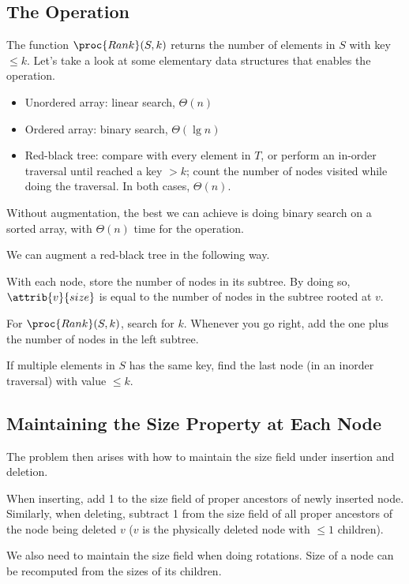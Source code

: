 \subsection{The  Operation}

The function $\proc{Rank}(S,k)$ returns the number of elements in $S$ with key $\leq k$. Let's take a look at some elementary data structures that enables the  operation.

\begin{itemize}
    \item Unordered array: linear search, $\Theta(n)$
    \item Ordered array: binary search, $\Theta(\lg n)$
    \item Red-black tree: compare with every element in $T$, or perform an in-order traversal until reached a key $> k$; count the number of nodes visited while doing the traversal. In both cases, $\Theta(n)$.
\end{itemize}

Without augmentation, the best we can achieve is doing binary search on a sorted array, with $\Theta(n)$ time for the  operation.

We can augment a red-black tree in the following way.

With each node, store the number of nodes in its subtree. By doing so, $\attrib{v}{size}$ is equal to the number of nodes in the subtree rooted at $v$.

For $\proc{Rank}(S,k)$, search for $k$. Whenever you go right, add the one plus the number of nodes in the left subtree. 

If multiple elements in $S$ has the same key, find the last node (in an inorder traversal) with value $\leq k$.

\subsection{Maintaining the Size Property at Each Node}

The problem then arises with how to maintain the size field under insertion and deletion.

When inserting, add 1 to the size field of proper ancestors of newly inserted node. Similarly, when deleting, subtract 1 from the size field of all proper ancestors of the node being deleted $v$ ($v$ is the physically deleted node with $\leq 1$ children).

We also need to maintain the size field when doing rotations. Size of a node can be recomputed from the sizes of its children.


